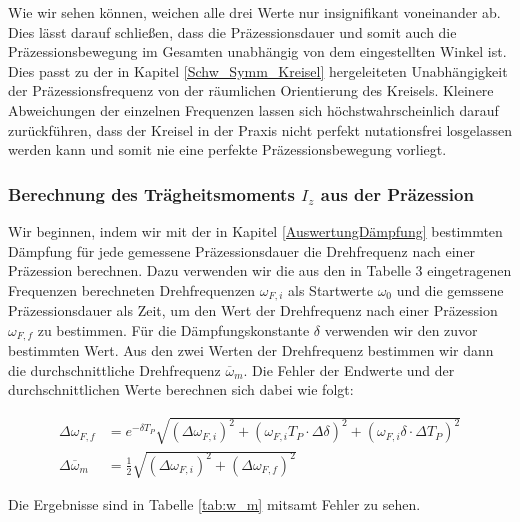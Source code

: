 \documentclass{article}
\begin{document}
Wie wir sehen können, weichen alle drei Werte nur insignifikant voneinander ab. Dies lässt darauf schließen, dass die Präzessionsdauer und somit auch die Präzessionsbewegung im Gesamten unabhängig von dem eingestellten Winkel ist. Dies passt zu der in Kapitel \ref{Schw_Symm_Kreisel} hergeleiteten Unabhängigkeit der Präzessionsfrequenz von der räumlichen Orientierung des Kreisels. Kleinere Abweichungen der einzelnen Frequenzen lassen sich höchstwahrscheinlich darauf zurückführen, dass der Kreisel in der Praxis nicht perfekt nutationsfrei losgelassen werden kann und somit nie eine perfekte Präzessionsbewegung vorliegt.


\subsubsection{Berechnung des Trägheitsmoments $I_z$ aus der Präzession}

Wir beginnen, indem wir mit der in Kapitel \ref{AuswertungDämpfung} bestimmten Dämpfung für jede gemessene Präzessionsdauer die Drehfrequenz nach einer Präzession berechnen. Dazu verwenden wir die aus den in Tabelle 3 eingetragenen Frequenzen berechneten Drehfrequenzen $\omega_{F,i}$ als Startwerte $\omega_0$ und die gemssene Präzessionsdauer als Zeit, um den Wert der Drehfrequenz nach einer Präzession $\omega_{F,f}$ zu bestimmen. Für die Dämpfungskonstante $\delta$ verwenden wir den zuvor bestimmten Wert. Aus den zwei Werten der Drehfrequenz bestimmen wir dann die durchschnittliche Drehfrequenz $\overline{\omega}_m$. Die Fehler der Endwerte und der durchschnittlichen Werte berechnen sich dabei wie folgt:

\begin{equation}
    \begin{split}
        \Delta \omega_{F,f} &= e^{-\delta T_P} \sqrt{\left( \Delta \omega_{F,i} \right)^2 + \left( \omega_{F,i} T_P \cdot \Delta \delta \right)^2 + \left( \omega_{F,i} \delta \cdot \Delta T_P \right)^2} \\
        \Delta \overline{\omega}_m &= \frac{1}{2} \sqrt{(\Delta \omega_{F,i})^2 + (\Delta \omega_{F,f})^2}
    \end{split}
\end{equation}

Die Ergebnisse sind in Tabelle \ref{tab:w_m} mitsamt Fehler zu sehen.
\end{document}
